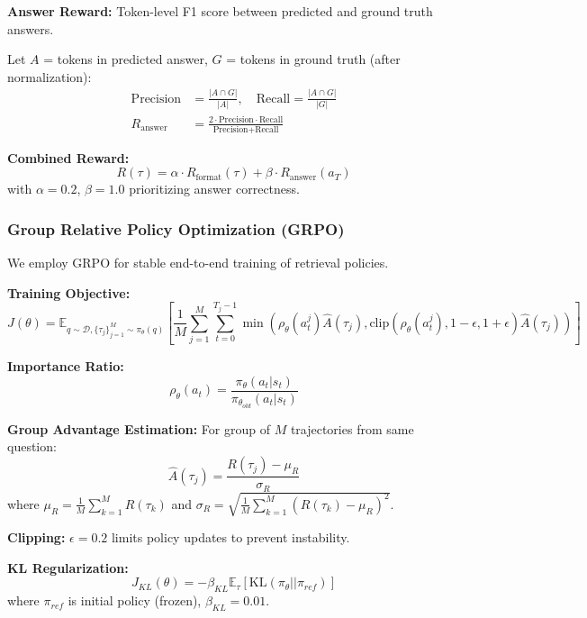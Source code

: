 \documentclass[11pt,a4paper]{article}
\begin{document}
\textbf{Answer Reward:} Token-level F1 score between predicted and ground truth answers.

Let $A$ = tokens in predicted answer, $G$ = tokens in ground truth (after normalization):
\begin{align}
\text{Precision} &= \frac{|A \cap G|}{|A|}, \quad \text{Recall} = \frac{|A \cap G|}{|G|} \\
R_{\text{answer}} &= \frac{2 \cdot \text{Precision} \cdot \text{Recall}}{\text{Precision} + \text{Recall}}
\end{align}

\textbf{Combined Reward:}
\begin{equation}
R(\tau) = \alpha \cdot R_{\text{format}}(\tau) + \beta \cdot R_{\text{answer}}(a_T)
\end{equation}
with $\alpha = 0.2$, $\beta = 1.0$ prioritizing answer correctness.

\subsubsection{Group Relative Policy Optimization (GRPO)}

We employ GRPO for stable end-to-end training of retrieval policies.

\textbf{Training Objective:}
\begin{equation}
J(\theta) = \mathbb{E}_{q \sim \mathcal{D}, \{\tau_j\}_{j=1}^M \sim \pi_\theta(q)}\left[\frac{1}{M} \sum_{j=1}^M \sum_{t=0}^{T_j-1} \min\left(\rho_\theta(a_t^j) \hat{A}(\tau_j), \text{clip}(\rho_\theta(a_t^j), 1-\epsilon, 1+\epsilon) \hat{A}(\tau_j)\right)\right]
\end{equation}

\textbf{Importance Ratio:}
\begin{equation}
\rho_\theta(a_t) = \frac{\pi_\theta(a_t | s_t)}{\pi_{\theta_{old}}(a_t | s_t)}
\end{equation}

\textbf{Group Advantage Estimation:} For group of $M$ trajectories from same question:
\begin{equation}
\hat{A}(\tau_j) = \frac{R(\tau_j) - \mu_R}{\sigma_R}
\end{equation}
where $\mu_R = \frac{1}{M}\sum_{k=1}^M R(\tau_k)$ and $\sigma_R = \sqrt{\frac{1}{M}\sum_{k=1}^M (R(\tau_k) - \mu_R)^2}$.

\textbf{Clipping:} $\epsilon = 0.2$ limits policy updates to prevent instability.

\textbf{KL Regularization:}
\begin{equation}
J_{KL}(\theta) = -\beta_{KL} \mathbb{E}_\tau \left[\text{KL}(\pi_\theta || \pi_{ref})\right]
\end{equation}
where $\pi_{ref}$ is initial policy (frozen), $\beta_{KL} = 0.01$.
\end{document}
